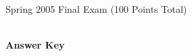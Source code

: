 \documentclass{article}
\begin{document}
\begin{comment}

\vspace*{-3cm}

\begin{flushright}
Name: \hspace*{1in}

\medskip
Student Number: \hspace*{1in}
\end{flushright}

\bigskip

\end{comment}

\begin{center}
\Large Spring 2005 Final Exam (100 Points Total) \begin{KEY}\\ \textbf{Answer Key}\end{KEY}
\end{center}
\normalsize
\bigskip
\end{document}
